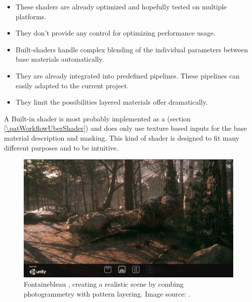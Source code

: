 \begin{description}
\begin{description}
\begin{itemize}
			\end{itemize}
			\item[\performance:]\hfill
			\begin{itemize}\mynobreakpar
				\item These shaders are already optimized and hopefully tested on multiple platforms.
				\item They don't provide any control for optimizing performance usage. 
			\end{itemize}
			\item[\pipeline:]\hfill
			\begin{itemize}\mynobreakpar
				\item Built-shaders handle complex blending of the individual parameters between base materials automatically. 
				\item They are already integrated into predefined pipelines. These pipelines can easily adapted to the current project. 
				\item They limit the possibilities layered materials offer dramatically. 
			\end{itemize}
		\end{description}
	\item[\patRelations:]%
	A Built-in shader is most probably implemented as a \emph{\patWorkflowUberShader} (section \ref{\patWorkflowUberShader}) and does only use texture based inputs for the base material description and masking.  %
	This kind of shader is designed to fit many different purposes and to be intuitive. %
\end{description}


\begin{figure}
	\centering
	\includegraphics[width=0.7\linewidth]{images/07cha_08_image8.jpg}
	\caption{Fontainebleau \cite{fontainebleu2018}, creating a realistic scene by combing photogrammetry with pattern layering. Image source: \cite{legarde2018photogrammetry}. }
	\label{fig:layeredLitFontainebleau}
\end{figure}

